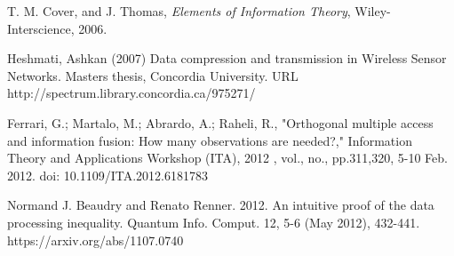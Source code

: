 \documentclass[a4paper,10pt]{article}
\begin{document}
\begin{thebibliography}{99}
T. M. Cover, and J. Thomas, \textit{Elements of Information Theory}, Wiley-Interscience, 2006.

Heshmati, Ashkan   (2007) Data compression and transmission in Wireless Sensor Networks.  
Masters thesis, Concordia University. URL http://spectrum.library.concordia.ca/975271/ 
  
Ferrari, G.; Martalo, M.; Abrardo, A.; Raheli, R., "Orthogonal multiple 
access and information fusion: How many observations are needed?," 
Information Theory and Applications Workshop (ITA), 2012 , vol., no., 
pp.311,320, 5-10 Feb. 2012. doi: 10.1109/ITA.2012.6181783
  
Normand J. Beaudry and Renato Renner. 2012. An intuitive proof of the data processing inequality. 
Quantum Info. Comput. 12, 5-6 (May 2012), 432-441. https://arxiv.org/abs/1107.0740

\end{thebibliography}
\end{document}
